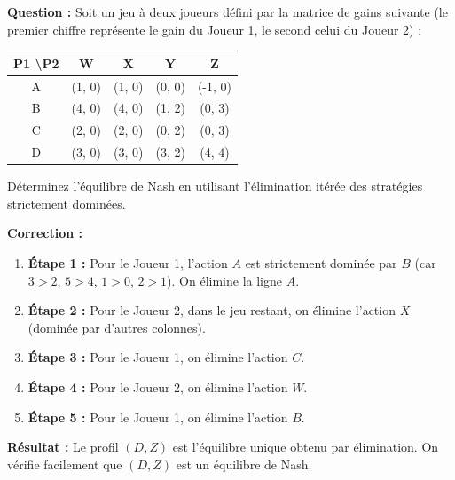 \begin{exemple}
\textbf{Question :}
Soit un jeu à deux joueurs défini par la matrice de gains suivante (le premier chiffre représente le gain du Joueur 1, le second celui du Joueur 2) :

\begin{center}
\begin{tabular}{c|cccc}
P1 \textbackslash P2 & W & X & Y & Z \\ \hline
A & (1, 0) & (1, 0) & (0, 0) & (-1, 0) \\
B & (4, 0) & (4, 0) & (1, 2) & (0, 3) \\
C & (2, 0) & (2, 0) & (0, 2) & (0, 3) \\
D & (3, 0) & (3, 0) & (3, 2) & (4, 4)
\end{tabular}
\end{center}

Déterminez l'équilibre de Nash en utilisant l'élimination itérée des stratégies strictement dominées.

\textbf{Correction :}
\begin{enumerate}
    \item \textbf{Étape 1 :} Pour le Joueur 1, l'action $A$ est strictement dominée par $B$ (car $3 > 2$, $5 > 4$, $1 > 0$, $2 > 1$). On élimine la ligne $A$.
    \item \textbf{Étape 2 :} Pour le Joueur 2, dans le jeu restant, on élimine l'action $X$ (dominée par d'autres colonnes).
    \item \textbf{Étape 3 :} Pour le Joueur 1, on élimine l'action $C$.
    \item \textbf{Étape 4 :} Pour le Joueur 2, on élimine l'action $W$.
    \item \textbf{Étape 5 :} Pour le Joueur 1, on élimine l'action $B$.
\end{enumerate}
\textbf{Résultat :} Le profil $(D, Z)$ est l'équilibre unique obtenu par élimination. On vérifie facilement que $(D, Z)$ est un équilibre de Nash.

\end{exemple}

